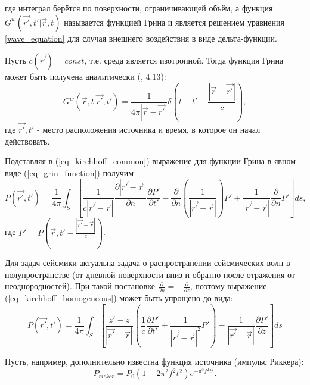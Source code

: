 \documentclass{article}
\begin{document}
где интеграл берётся по поверхности, ограничивающей объём, а функция $G^w(\vec{r'}, t' | \vec{r}, t)$ называется функцией Грина и является решением уравнения \ref{wave_equation} для случая внешнего воздействия в виде дельта-функции.

Пусть $c(\vec{r'}) = const$, т.е. среда является изотропной.
Тогда функция Грина может быть получена аналитически (\cite{Zhdanov_1988}, 4.13):
\begin{equation}
\label{eq_grin_function}
G^w(\vec{r}, t | \vec{r'}, t') = \frac{1}{4\pi|\vec{r} - \vec{r'}|}\delta(t - t' - \frac{|\vec{r} -
\vec{r'}|}{c}),
\end{equation}
где $\vec{r'}, t'$ - место расположения источника и время, в которое он начал действовать.

Подставляя в (\ref{eq_kirchhoff_common}) выражение для функции Грина в явном виде (\ref{eq_grin_function}) получим
\begin{equation}
\label{eq_kirchhoff_homogeneous}
P(\vec{r'}, t') = \frac{1}{4\pi} \int_S [\frac{1}{c|\vec{r'} - \vec{r}|}
\frac{\partial |\vec{r'} - \vec{r}|}{\partial n}\frac{\partial P'}{\partial t'}
- \frac{\partial}{\partial n}(\frac{1}{|\vec{r'} - \vec{r}|}) P' + 
\frac{1}{|\vec{r'} - \vec{r}|}\frac{\partial}{\partial n}P'] ds,
\end{equation}
где $P' = P(\vec{r}, t' - \frac{|\vec{r'} - \vec{r}|}{c})$.
 
Для задач сейсмики актуальна задача о распространении сейсмических волн в полупространстве (от дневной поверхности вниз и обратно после отражения от неоднородностей).
При такой постановке $\frac{\partial}{\partial n} = -\frac{\partial}{\partial z}$, поэтому выражение (\ref{eq_kirchhoff_homogeneous}) может быть упрощено до вида:
\begin{equation}
\label{eq_kirchhoff_final}
P(\vec{r'}, t') = \frac{1}{4\pi} \int_S [\frac{z' - z}{|\vec{r'} - \vec{r}|}(\frac{1}{c}
\frac{\partial P'}{\partial t'} + \frac{1}{|\vec{r'} - \vec{r}|^2} P') - \frac{1}{|\vec{r'}
- \vec{r}|}\frac{\partial P'}{\partial z}] ds
\end{equation}

Пусть, например, дополнительно известна функция источника (импульс Риккера):
\begin{equation}
\label{eq_ricker_wavelet}
P_{ricker} = P_0(1-2 \pi^2f^2t^2)e^{-\pi^2f^2t^2}.
\end{equation}
\end{document}
